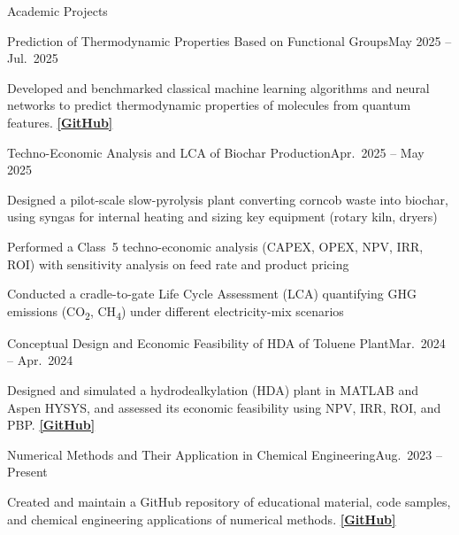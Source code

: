 \documentclass[]{kyvernitis-resume}
\begin{document}
\begin{section}{Academic Projects}
    \begin{project}{Prediction of Thermodynamic Properties Based on Functional Groups}{May 2025 -- Jul.\ 2025}{}
        \item Developed and benchmarked classical machine learning algorithms and neural networks to predict thermodynamic properties of molecules from quantum features. \href{https://github.com/SinaGhanbarii/Prediction-of-thermodynamic-properties-based-on-functional-groups}{\textbf{[GitHub]}}
    \end{project}

    \begin{project}{Techno-Economic Analysis and LCA of Biochar Production}{Apr.\ 2025 -- May 2025}{}
        \item Designed a pilot-scale slow-pyrolysis plant converting corncob waste into biochar, using syngas for internal heating and sizing key equipment (rotary kiln, dryers)
        \item Performed a Class~5 techno-economic analysis (CAPEX, OPEX, NPV, IRR, ROI) with sensitivity analysis on feed rate and product pricing
        \item Conducted a cradle-to-gate Life Cycle Assessment (LCA) quantifying GHG emissions (CO\textsubscript{2}, CH\textsubscript{4}) under different electricity-mix scenarios
    \end{project}

    \begin{project}{Conceptual Design and Economic Feasibility of HDA of Toluene Plant}{Mar.\ 2024 -- Apr.\ 2024}{}
        \item Designed and simulated a hydrodealkylation (HDA) plant in MATLAB and Aspen HYSYS, and assessed its economic feasibility using NPV, IRR, ROI, and PBP. \href{https://github.com/SinaGhanbarii/HDA-Plant-Simulation}{\textbf{[GitHub]}}
    \end{project}

    \begin{project}{Numerical Methods and Their Application in Chemical Engineering}{Aug.\ 2023 -- Present}{}
        \item Created and maintain a GitHub repository of educational material, code samples, and chemical engineering applications of numerical methods. \href{https://github.com/SinaGhanbarii/Numerical-Methods-and-Their-Application-in-Chemical-Engineering}{\textbf{[GitHub]}}
    \end{project}


\end{section}
\end{document}
